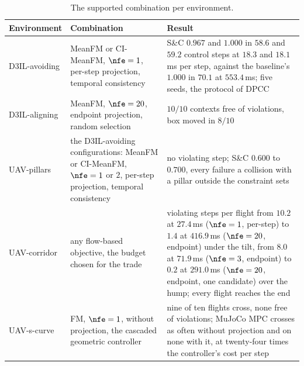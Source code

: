 \begin{table}[htpb]
  \caption[Selected model--projection combinations]{The supported combination per environment.}
  \label{tab:summary-combinations}
  \centering
  \small
  \begin{tabularx}{\linewidth}{@{}p{2.2cm} L L@{}}
    \toprule
    Environment & Combination & Result \\
    \midrule
    D3IL-avoiding
      & MeanFM or CI-MeanFM, $\nfe=1$, per-step projection, temporal consistency
      & S\&C $0.967$ and $1.000$ in $58.6$ and $59.2$ control steps at $18.3$ and $18.1$\,ms per step, against the
        baseline's $1.000$ in $70.1$ at $553.4$\,ms; five seeds, the protocol of \ac{DPCC} \\
    D3IL-aligning
      & MeanFM, $\nfe=20$, endpoint projection, random selection
      & $10/10$ contexts free of violations, box moved in $8/10$ \\
    UAV-pillars
      & the D3IL-avoiding configurations: MeanFM or CI-MeanFM, $\nfe=1$ or $2$, per-step projection, temporal
        consistency
      & no violating step; S\&C $0.600$ to $0.700$, every failure a collision with a pillar outside the
        constraint sets \\
    UAV-corridor
      & any flow-based objective, the budget chosen for the trade
      & violating steps per flight from $10.2$ at $27.4$\,ms ($\nfe=1$, per-step) to $1.4$ at $416.9$\,ms
        ($\nfe=20$, endpoint) under the tilt, from $8.0$ at $71.9$\,ms ($\nfe=3$, endpoint) to $0.2$ at
        $291.0$\,ms ($\nfe=20$, endpoint, one candidate) over the hump; every flight reaches the end \\
    UAV-s-curve
      & FM, $\nfe=1$, without projection, the cascaded geometric controller
      & nine of ten flights cross, none free of violations; MuJoCo MPC crosses as often without projection and on
        none with it, at twenty-four times the controller's cost per step \\
    \bottomrule
  \end{tabularx}
\end{table}

